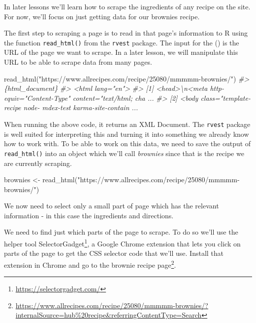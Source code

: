 \documentclass[
]{krantz}
\makeatletter
\newenvironment{Shaded}{\begin{snugshade}}{\end{snugshade}}
\newcommand{\CommentTok}[1]{\textcolor[rgb]{0.37,0.37,0.37}{\textit{#1}}}
\newcommand{\FunctionTok}[1]{\textcolor[rgb]{0,0,0}{#1}}
\newcommand{\NormalTok}[1]{#1}
\newcommand{\OtherTok}[1]{\textcolor[rgb]{0.37,0.37,0.37}{#1}}
\newcommand{\StringTok}[1]{\textcolor[rgb]{0.5,0.5,0.5}{#1}}
\renewcommand{\href}[2]{#2\footnote{\url{#1}}}
\newenvironment{kframe}{%
\medskip{}
\setlength{\fboxsep}{.8em}
 \def\at@end@of@kframe{}%
 \ifinner\ifhmode%
  \def\at@end@of@kframe{\end{minipage}}%
  \begin{minipage}{\columnwidth}%
 \fi\fi%
 \def\FrameCommand##1{\hskip\@totalleftmargin \hskip-\fboxsep
 \colorbox{shadecolor}{##1}\hskip-\fboxsep
     \hskip-\linewidth \hskip-\@totalleftmargin \hskip\columnwidth}%
 \MakeFramed {\advance\hsize-\width
   \@totalleftmargin\z@ \linewidth\hsize
   \@setminipage}}%
 {\par\unskip\endMakeFramed%
 \at@end@of@kframe}
\renewenvironment{Shaded}{\begin{kframe}}{\end{kframe}}
\makeatother
\begin{document}
In later lessons we'll learn how to scrape the ingredients of any recipe on the site. For now, we'll focus on just getting data for our brownies recipe.

The first step to scraping a page is to read in that page's information to R using the function \texttt{read\_html()} from the \texttt{rvest} package. The input for the () is the URL of the page we want to scrape. In a later lesson, we will manipulate this URL to be able to scrape data from many pages.

\begin{Shaded}
\begin{Highlighting}[]
\FunctionTok{read\_html}\NormalTok{(}\StringTok{"https://www.allrecipes.com/recipe/25080/mmmmm{-}brownies/"}\NormalTok{)}
\CommentTok{\#\textgreater{} \{html\_document\}}
\CommentTok{\#\textgreater{} \textless{}html lang="en"\textgreater{}}
\CommentTok{\#\textgreater{} [1] \textless{}head\textgreater{}\textbackslash{}n\textless{}meta http{-}equiv="Content{-}Type" content="text/html; cha ...}
\CommentTok{\#\textgreater{} [2] \textless{}body class="template{-}recipe node{-} mdex{-}test karma{-}site{-}contain ...}
\end{Highlighting}
\end{Shaded}

When running the above code, it returns an XML Document. The \texttt{rvest} package is well suited for interpreting this and turning it into something we already know how to work with. To be able to work on this data, we need to save the output of \texttt{read\_html()} into an object which we'll call \emph{brownies} since that is the recipe we are currently scraping.

\begin{Shaded}
\begin{Highlighting}[]
\NormalTok{brownies }\OtherTok{\textless{}{-}} \FunctionTok{read\_html}\NormalTok{(}\StringTok{"https://www.allrecipes.com/recipe/25080/mmmmm{-}brownies/"}\NormalTok{)}
\end{Highlighting}
\end{Shaded}

We now need to select only a small part of page which has the relevant information - in this case the ingredients and directions.

We need to find just which parts of the page to scrape. To do so we'll use the helper tool \href{https://selectorgadget.com/}{SelectorGadget}, a Google Chrome extension that lets you click on parts of the page to get the CSS selector code that we'll use. Install that extension in Chrome and go to the \href{https://www.allrecipes.com/recipe/25080/mmmmm-brownies/?internalSource=hub\%20recipe\&referringContentType=Search}{brownie recipe page}.
\end{document}
